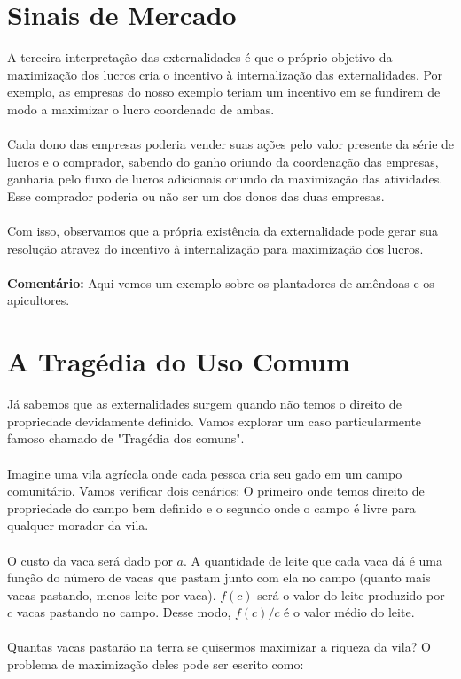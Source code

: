 \documentclass[a4paper,11pt,oneside]{book}
\theoremstyle{definition}
\theoremstyle{break}
\begin{document}
\section{Sinais de Mercado}

A terceira interpretação das externalidades é que o próprio objetivo da maximização dos lucros cria o incentivo à internalização das externalidades. Por exemplo, as empresas do nosso exemplo teriam um incentivo em se fundirem de modo a maximizar o lucro coordenado de ambas.
\\
\\
Cada dono das empresas poderia vender suas ações pelo valor presente da série de lucros e o comprador, sabendo do ganho oriundo da coordenação das empresas, ganharia pelo fluxo de lucros adicionais oriundo da maximização das atividades. Esse comprador poderia ou não ser um dos donos das duas empresas.
\\
\\
Com isso, observamos que a própria existência da externalidade pode gerar sua resolução atravez do incentivo à internalização para maximização dos lucros.
\\
\\
\textbf{Comentário:} Aqui vemos um exemplo sobre os plantadores de amêndoas e os apicultores. 

\section{A Tragédia do Uso Comum}

Já sabemos que as externalidades surgem quando não temos o direito de propriedade devidamente definido. Vamos explorar um caso particularmente famoso chamado de "Tragédia dos comuns".
\\
\\
Imagine uma vila agrícola onde cada pessoa cria seu gado em um campo comunitário. Vamos verificar dois cenários: O primeiro onde temos direito de propriedade do campo bem definido e o segundo onde o campo é livre para qualquer morador da vila.
\\
\\
O custo da vaca será dado por $a$. A quantidade de leite que cada vaca dá é uma função do número de vacas que pastam junto com ela no campo (quanto mais vacas pastando, menos leite por vaca). $f(c)$ será o valor do leite produzido por $c$ vacas pastando no campo. Desse modo, $f(c)/c$ é o valor médio do leite.
\\
\\
Quantas vacas pastarão na terra se quisermos maximizar a riqueza da vila? O problema de maximização deles pode ser escrito como:
\end{document}
